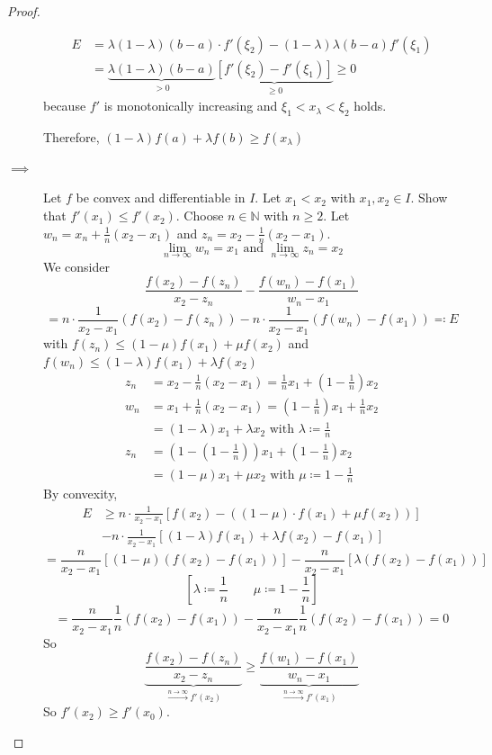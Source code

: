 \documentclass[a4paper,landscape,twocolumn]{article}
\theoremstyle{definition}
\begin{document}
\begin{proof}
\begin{description}
      \begin{align*}
        E &= \lambda (1 - \lambda) (b - a) \cdot f'(\xi_2) - (1 - \lambda) \lambda (b - a) f'(\xi_1) \\
          &= \underbrace{\lambda (1 - \lambda) (b - a)}_{> 0} \underbrace{\left[f'(\xi_2) - f'(\xi_1)\right]}_{\geq 0} \geq 0
      \end{align*}
      because $f'$ is monotonically increasing and $\xi_1 < x_\lambda < \xi_2$ holds.

      Therefore, $(1 - \lambda) f(a) + \lambda f(b) \geq f(x_\lambda)$
    \item[$\implies$]
      Let $f$ be convex and differentiable in $I$. Let $x_1 < x_2$ with $x_1, x_2 \in I$.
      Show that $f'(x_1) \leq f'(x_2)$.
      Choose $n \in \mathbb N$ with $n \geq 2$. Let $w_n = x_n + \frac1n (x_2 - x_1)$ and
      $z_n = x_2 - \frac 1n (x_2 - x_1)$.
      \[ \lim_{n\to\infty} w_n = x_1 \text{ and } \lim_{n\to\infty} z_n = x_2 \]
      We consider
      \[ \frac{f(x_2) - f(z_n)}{x_2 - z_n} - \frac{f(w_n) - f(x_1)}{w_n - x_1} \]
      \[
        = n \cdot \frac{1}{x_2 - x_1} \left( f(x_2) - f(z_n) \right)
        - n \cdot \frac{1}{x_2 - x_1} \left( f(w_n) - f(x_1) \right)
        \eqqcolon E
      \]
      with $f(z_n) \leq (1 - \mu) f(x_1) + \mu f(x_2)$
      and $f(w_n) \leq (1 - \lambda) f(x_1) + \lambda f(x_2)$
      \begin{align*}
        z_n &= x_2 - \frac 1n (x_2 - x_1) = \frac 1n x_1 + \left(1 - \frac1n\right) x_2 \\
        w_n &= x_1 + \frac 1n (x_2 - x_1) = \left(1 - \frac1n\right) x_1 + \frac 1n x_2 \\
            &= (1 - \lambda) x_1 + \lambda x_2 \text{ with } \lambda \coloneqq \frac1n \\
        z_n &= \left(1 - (1 - \frac1n)\right) x_1 + \left(1 - \frac1n\right) x_2 \\
            &= (1 - \mu) x_1 + \mu x_2 \text{ with } \mu \coloneqq 1 - \frac 1n
      \end{align*}
      By convexity,
      \begin{align*}
        E &\geq n \cdot \frac{1}{x_2 - x_1} \left[ f(x_2) - \left((1 - \mu) \cdot f(x_1) + \mu f(x_2)\right) \right] \\
          &   - n \cdot \frac{1}{x_2 - x_1} \left[ (1 - \lambda) f(x_1) + \lambda f(x_2) - f(x_1) \right]
      \end{align*}
      \[
        = \frac{n}{x_2 - x_1} \left[(1 - \mu) (f(x_2) - f(x_1))\right]
        - \frac{n}{x_2 - x_1} \left[\lambda (f(x_2) - f(x_1))\right]
      \] \[
        \left[ \lambda \coloneqq \frac1n \qquad \mu \coloneqq 1 - \frac1n \right]
      \] \[
        = \frac{n}{x_2 - x_1} \frac1n \left(f(x_2) - f(x_1)\right)
        - \frac{n}{x_2 - x_1} \frac1n (f(x_2) - f(x_1)) = 0
      \]
      So
      \[
             \underbrace{\frac{f(x_2) - f(z_n)}{x_2 - z_n}}_{\xrightarrow{n \to \infty} f'(x_2)}
        \geq \underbrace{\frac{f(w_1) - f(x_1)}{w_n - x_1}}_{\xrightarrow{n \to \infty} f'(x_1)}
      \]
      So $f'(x_2) \geq f'(x_0)$.
  \end{description}
\end{proof}
\end{document}
